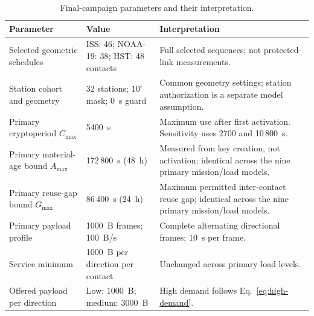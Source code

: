 \documentclass[conference]{IEEEtran}
\newcommand{\CoreMaterialAge}{%
    172\,800~s (48~h)%
}
\newcommand{\CoreReuseGap}{%
    86\,400~s (24~h)%
}
\begin{document}
\begin{table}[!t]
    \centering
    \footnotesize
    \setlength{\tabcolsep}{4pt}
    \renewcommand{\arraystretch}{1.12}

    \caption{
        Final-campaign parameters and their interpretation.
    }
    \label{tab:parameters}

    \begin{tabularx}{\textwidth}{
        @{}
        p{}
        p{}
        Y
        @{}
    }
        \toprule
        Parameter & Value & Interpretation \\
        \midrule

        Selected geometric schedules
        &
        ISS: 46; NOAA-19: 38; HST: 48 contacts
        &
        Full selected sequences; not protected-link measurements.
        \\

        Station cohort and geometry
        &
        32 stations; $10^\circ$ mask; 0~s guard
        &
        Common geometry settings; station authorization is
        a separate model assumption.
        \\

        Primary cryptoperiod $C_{\max}$
        &
        5400~s
        &
        Maximum use after first activation.
        Sensitivity uses 2700 and 10\,800~s.
        \\

        Primary material-age bound $A_{\max}$
        &
        \CoreMaterialAge
        &
        Measured from key creation, not activation;
        identical across the nine primary mission/load models.
        \\

        Primary reuse-gap bound $G_{\max}$
        &
        \CoreReuseGap
        &
        Maximum permitted inter-contact reuse gap;
        identical across the nine primary mission/load models.
        \\

        Primary payload profile
        &
        1000~B frames; 100~B/s
        &
        Complete alternating directional frames;
        10~s per frame.
        \\

        Service minimum
        &
        1000~B per direction per contact
        &
        Unchanged across primary load levels.
        \\

        Offered payload per direction
        &
        Low: 1000~B; medium: 3000~B
        &
        High demand follows Eq.~\eqref{eq:high-demand}.
        \\


\end{tabularx}
\end{table}
\end{document}
